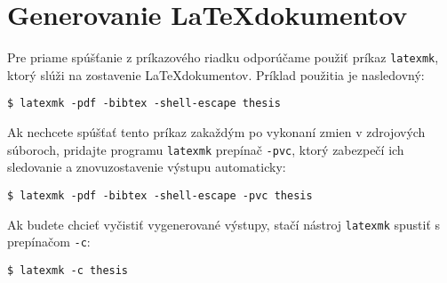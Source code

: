 \section{Generovanie \LaTeX dokumentov}

Pre priame spúšťanie z príkazového riadku odporúčame použiť príkaz {\tt latexmk}, ktorý slúži na zostavenie  \LaTeX dokumentov. Príklad použitia je nasledovný:

\begin{verbatim}
$ latexmk -pdf -bibtex -shell-escape thesis
\end{verbatim}

Ak nechcete spúšťať tento príkaz zakaždým po vykonaní zmien v zdrojových súboroch, pridajte programu {\tt latexmk} prepínač {\tt -pvc}, ktorý zabezpečí ich sledovanie a znovuzostavenie výstupu automaticky:

\begin{verbatim}
$ latexmk -pdf -bibtex -shell-escape -pvc thesis
\end{verbatim}

Ak budete chcieť vyčistiť vygenerované výstupy, stačí nástroj {\tt latexmk} spustiť s prepínačom {\tt -c}:

\begin{verbatim}
$ latexmk -c thesis
\end{verbatim}
